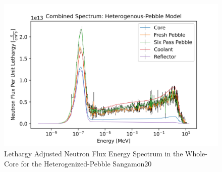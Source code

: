 \begin{figure}[H]
\centering

  \includegraphics[width=0.95\linewidth]{figures/all_spec_het_v2}
  \caption{Lethargy Adjusted Neutron Flux Energy Spectrum in the Whole-Core for the Heterogenized-Pebble Sangamon20}
  \label{fig:het-all}

\end{figure}

%
%
%
%
%
%
%
%
%
%
%
%
